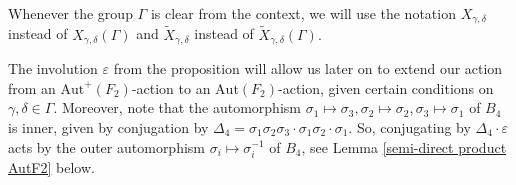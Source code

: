 \documentclass[letterpaper]{amsart}
\begin{document}
Whenever the group $\Gamma$ is clear from the context, we will use the notation $X_{\gamma,\delta}$ instead of $X_{\gamma,\delta}(\Gamma)$ and $\tilde{X}_{\gamma,\delta}$ instead of $\tilde{X}_{\gamma, \delta}(\Gamma).$

The involution $\varepsilon$ from the proposition will allow us later on to extend our action from an $\mathrm{Aut}^{+}(F_2)$-action to an $\mathrm{Aut}(F_2)$-action, given certain conditions on $\gamma,\delta \in \Gamma$. Moreover, note that the automorphism $\sigma_1 \mapsto \sigma_3, \sigma_2 \mapsto \sigma_2, \sigma_3 \mapsto \sigma_1$ of $B_4$ is inner, given by conjugation by $\Delta_4 = \sigma_1\sigma_2\sigma_3 \cdot \sigma_1\sigma_2 \cdot \sigma_1$. So, conjugating by $\Delta_4\cdot\varepsilon$ acts by the outer automorphism $\sigma_i \mapsto \sigma_i^{-1}$ of $B_4$, see Lemma \ref{semi-direct product AutF2} below.
\end{document}

